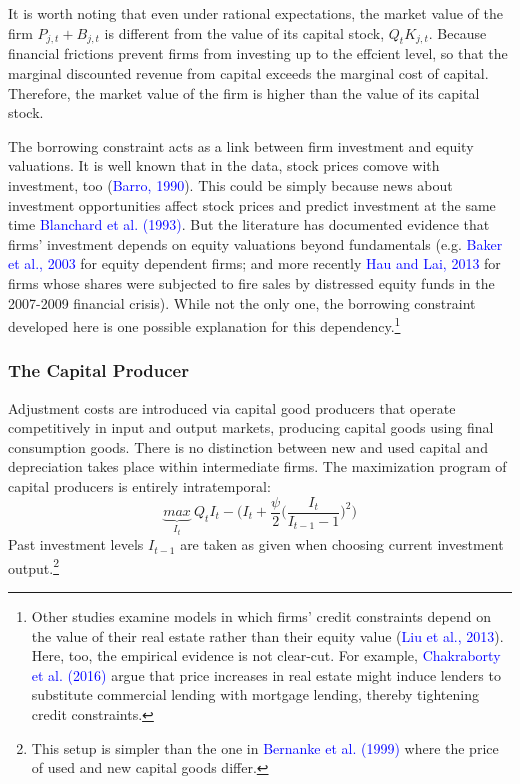 \documentclass[10pt,math=newtx,citestyle=gb7714-2015,bibstyle=gb7714-2015]{elegantbook}
\begin{document}
{{{			It is worth noting that even under rational expectations, the market value of the firm $P_{j,t} + B_{j,t}$ is different from the value of its capital stock, $Q_tK_{j,t}$. Because financial frictions prevent firms from investing up to the effcient level, so that the marginal discounted revenue from capital exceeds the
			marginal cost of capital. Therefore, the market value of the firm is higher than the value of its capital stock.
			
			The borrowing constraint acts as a link between firm investment and equity valuations. It is well known that in the data, stock prices comove with investment, too (\textcolor{blue}{Barro, 1990}). This could be simply because news about investment opportunities affect stock prices and predict investment
			at the same time \textcolor{blue}{Blanchard et al. (1993)}. But the literature has documented evidence that firms' investment depends on equity valuations beyond fundamentals (e.g. \textcolor{blue}{Baker et al., 2003} for equity dependent firms; and more recently \textcolor{blue}{Hau and Lai, 2013} for firms whose shares were subjected to fire sales by distressed equity funds in the 2007-2009 financial crisis). While not the only one, the borrowing constraint developed here is one possible explanation for this dependency.\footnote{Other studies examine models in which firms' credit constraints depend on the value of their real estate rather than their equity value (\textcolor{blue}{Liu et al., 2013}). Here, too, the empirical evidence is not clear-cut. For example, \textcolor{blue}{Chakraborty et al. (2016)} argue that price increases in real estate might induce lenders to substitute commercial lending with mortgage lending, thereby tightening credit constraints.}
			
			\subsubsection{The Capital Producer}
			Adjustment costs are introduced via capital good producers that operate competitively in input and output markets, producing capital goods using final consumption goods. There is no distinction between new and used capital and depreciation takes place within intermediate firms. The maximization program of capital producers is entirely intratemporal:
			\begin{equation*}
				\underbrace{max}_{I_t}~Q_tI_t-\bigg(I_t+\frac{\psi}{2}\big(\frac{I_t}{I_{t-1}-1}\big)^2\bigg)
			\end{equation*}
			Past investment levels $I_{t-1}$ are taken as given when choosing current investment output.\footnote{This setup is simpler than the one in \textcolor{blue}{Bernanke et al. (1999)} where the price of used and new capital goods differ.}
			
}}}
\end{document}
